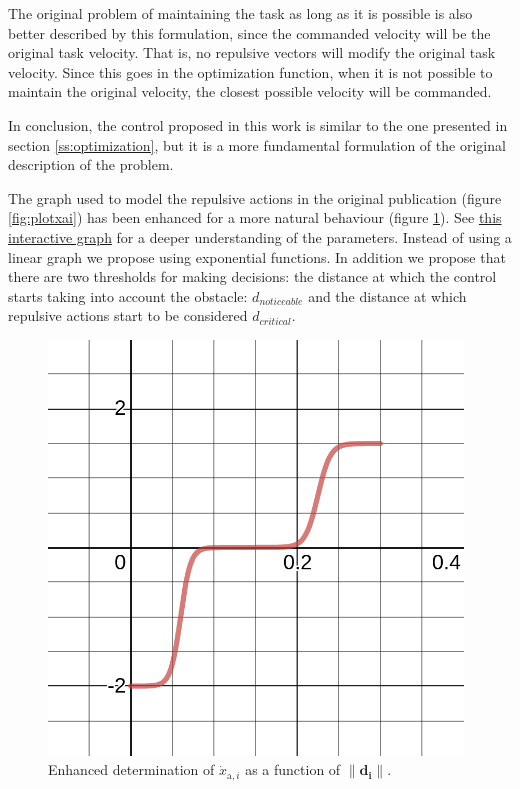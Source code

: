 The original problem of maintaining the task as long as it is possible is also better described by this formulation, since the commanded velocity will be the original task velocity. That is, no repulsive vectors will modify the original task velocity. Since this goes in the optimization function, when it is not possible to maintain the original velocity, the closest possible velocity will be commanded.

In conclusion, the control proposed in this work is similar to the one presented in section \ref{ss:optimization}, but it is a more fundamental formulation of the original description of the problem.

The graph used to model the repulsive actions in the original publication (figure \ref{fig:plotxai}) has been enhanced for a more natural behaviour (figure \ref{fig:enhancedxai}). See \href{https://www.desmos.com/calculator/q2qofyanu9}{this interactive graph} for a deeper understanding of the parameters. Instead of using a linear graph we propose using exponential functions. In addition we propose that there are two thresholds for making decisions: the distance at which the control starts taking into account the obstacle: $d_{noticeable}$ and the distance at which repulsive actions start to be considered $d_{critical}$.

\begin{figure}[H]
    \caption[pandafloor]{
        Enhanced determination of $\dot{x}_{\mathrm{a}, i}$ as a function of $\|\mathbf{d_i}\|$.
    }
    \begin{center}
    \includegraphics[width=110mm]{figs/desmos-graph.png}
    \end{center}
\label{fig:enhancedxai}
\end{figure}

